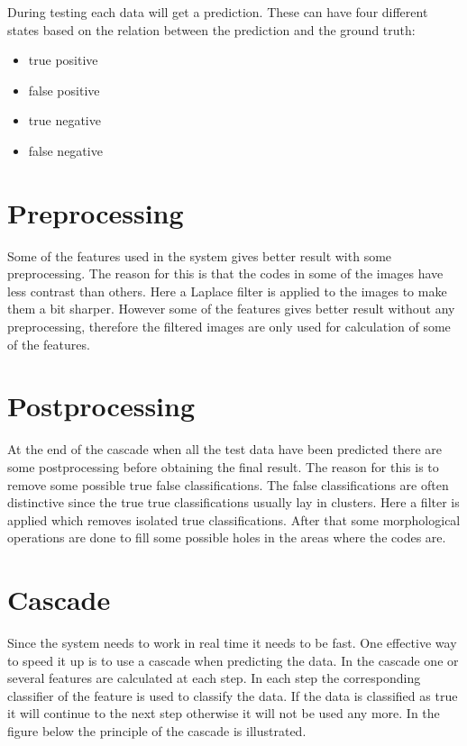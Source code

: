 During testing each data will get a prediction. These can have four different states based on the relation between the prediction and the ground truth:
\begin{itemize}
	\item true positive
	\item false positive
	\item true negative
	\item false negative
\end{itemize}

\section{Preprocessing}
\label{Preprocessing}
Some of the features used in the system gives better result with some preprocessing. The reason for this is that the codes in some of the images have less contrast than others. Here a Laplace filter is applied to the images to make them a bit sharper. However some of the features gives better result without any preprocessing, therefore the filtered images are only used for calculation of some of the features.

\section{Postprocessing}
\label{Postprocessing}
At the end of the cascade when all the test data have been predicted there are some postprocessing before obtaining the final result. The reason for this is to remove some possible true false classifications. The false classifications are often distinctive since the true true classifications usually lay in clusters. Here a filter is applied which removes isolated true classifications. After that some morphological operations are done to fill some possible holes in the areas where the codes are.

\section{Cascade}
\label{sec:Cascade}
Since the system needs to work in real time it needs to be fast. One effective way to speed it up is to use a cascade when predicting the data. In the cascade one or several features are calculated at each step. In each step the corresponding classifier of the feature is used to classify the data. If the data is classified as true it will continue to the next step otherwise it will not be used any more. In the figure below the principle of the cascade is illustrated.

